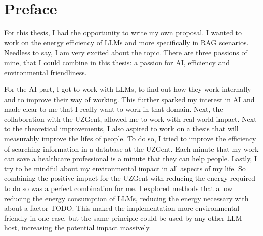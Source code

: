 
\titleformat{\chapter}{}{}{0em}{\bf\Huge}
\chapter*{Preface}

For this thesis, I had the opportunity to write my own proposal. I wanted to work on the energy efficiency of LLMs and more specifically in RAG scenarios. Needless to say, I am very excited about the topic. There are three passions of mine, that I could combine in this thesis: a passion for AI, efficiency and environmental friendliness. 

For the AI part, I got to work with LLMs, to find out how they work internally and to improve their way of working. This further sparked my interest in AI and made clear to me that I really want to work in that domain. Next, the collaboration with the UZGent, allowed me to work with real world impact. Next to the theoretical improvements, I also aspired to work on a thesis that will measurably improve the lifes of people. To do so, I tried to improve the efficiency of searching information in a database at the UZGent. Each minute that my work can save a healthcare professional is a minute that they can help people. Lastly, I try to be mindful about my environmental impact in all aspects of my life. So combining the positive impact for the UZGent with reducing the energy required to do so was a perfect combination for me. I explored methods that allow reducing the energy consumption of LLMs, reducing the energy necessary with about a factor TODO. This maked the implementation more environmental friendly in one case, but the same principle could be used by any other LLM host, increasing the potential impact massively.
